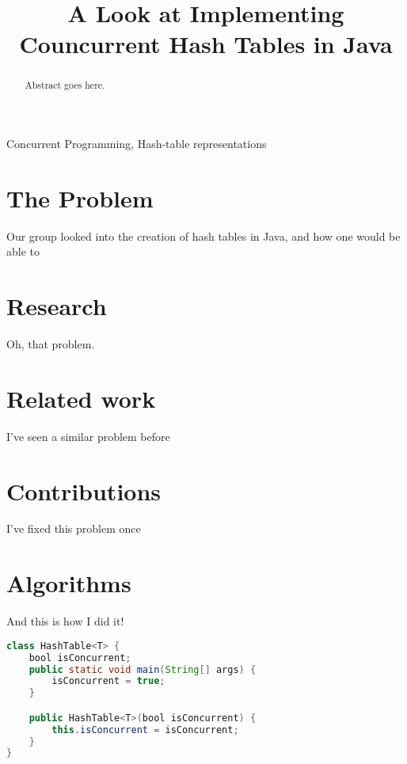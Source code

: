 \documentclass[conference]{IEEEtran}
\begin{document}
\title{A Look at Implementing Councurrent Hash Tables in Java}

\author{
\and
{}
\and
{}
}

\maketitle

\begin{abstract}
Abstract goes here.
\end{abstract}

\begin{IEEEkeywords}
Concurrent Programming, Hash-table representations
\end{IEEEkeywords}

\section{The Problem}
Our group looked into the creation of hash tables in Java, and how one would be able to 

\section{Research}
Oh, that problem.

\section{Related work}
I've seen a similar problem before

\section{Contributions}
I've fixed this problem once

\section{Algorithms}
And this is how I did it!
\begin{lstlisting}[language={Java},caption=Testing surce code in \LaTeX{}.,breaklines=true,frame=single]
class HashTable<T> {
    bool isConcurrent;
    public static void main(String[] args) {
        isConcurrent = true;
    }

    public HashTable<T>(bool isConcurrent) {
        this.isConcurrent = isConcurrent;
    }
}
\end{lstlisting}
\end{document}
